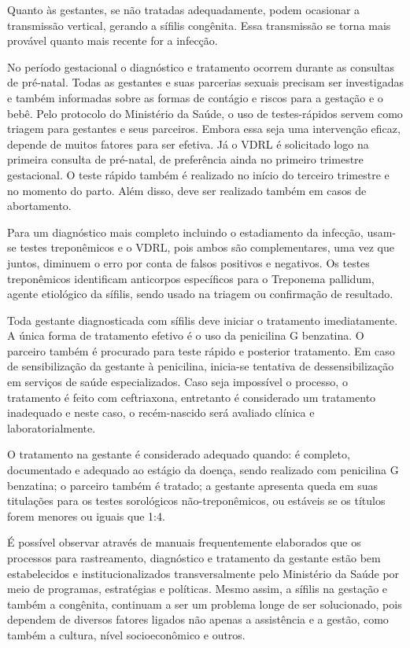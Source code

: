 Quanto às gestantes, se não tratadas adequadamente, podem ocasionar a transmissão vertical, gerando a sífilis congênita. Essa transmissão se torna mais provável quanto mais recente for a infecção. 

No período gestacional o diagnóstico e tratamento ocorrem durante as consultas de  pré-natal. Todas as gestantes e suas parcerias sexuais precisam ser investigadas  e também informadas sobre as formas de contágio e riscos para a gestação e o bebê. Pelo protocolo do Ministério da Saúde, o uso de testes-rápidos servem como triagem para gestantes e seus parceiros. Embora essa seja uma intervenção eficaz,  depende de muitos fatores para ser efetiva. Já o VDRL é solicitado logo na primeira consulta de pré-natal, de preferência ainda no primeiro trimestre gestacional. O teste rápido também é realizado no início do terceiro trimestre e no momento do parto. Além disso, deve ser realizado também em casos de abortamento. \cite{brasil2015protocolo}

Para um diagnóstico mais completo incluindo o estadiamento da infecção, usam-se testes treponêmicos e o VDRL, pois ambos são complementares, uma vez que juntos, diminuem o erro por conta de falsos positivos e negativos. Os testes treponêmicos identificam anticorpos específicos para o Treponema pallidum, agente etiológico da sífilis, sendo usado na triagem ou confirmação de resultado. \cite{sao2016guia}

Toda gestante diagnosticada com sífilis deve iniciar o tratamento imediatamente. A única forma de tratamento efetivo é o uso da penicilina G benzatina. O parceiro também é procurado para teste rápido e posterior tratamento. Em caso de sensibilização da gestante à penicilina, inicia-se tentativa de dessensibilização em serviços de saúde especializados. Caso seja impossível o processo, o tratamento é feito com ceftriaxona, entretanto é considerado um tratamento inadequado e neste caso, o recém-nascido será avaliado clínica e laboratorialmente. \cite{sao2016guia}

O tratamento na gestante é considerado adequado quando: é completo, documentado e adequado ao estágio da doença, sendo realizado com penicilina G benzatina; o parceiro também é tratado; a gestante apresenta queda em suas titulações para os testes sorológicos não-treponêmicos, ou estáveis se os títulos forem menores ou iguais que 1:4. \cite{sao2016guia}

É possível observar através de manuais frequentemente elaborados que os processos para rastreamento, diagnóstico e tratamento da gestante estão bem estabelecidos e institucionalizados transversalmente pelo Ministério da Saúde por meio de programas, estratégias e políticas. Mesmo assim, a sífilis na gestação e também a congênita, continuam a ser um problema longe de ser solucionado, pois dependem de diversos fatores ligados não apenas a assistência e a gestão, como também a cultura, nível socioeconômico e outros. 

